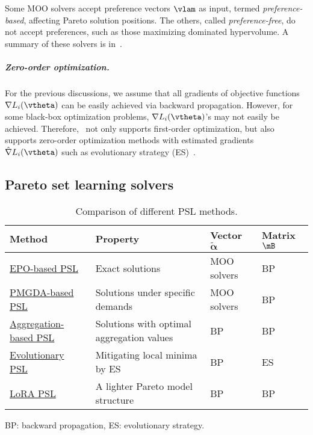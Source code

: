 Some MOO solvers accept preference vectors $\vlam$ as input, termed \emph{preference-based}, affecting Pareto solution positions. The others, called \emph{preference-free}, do not accept preferences, such as those maximizing dominated hypervolume. A summary of these solvers is in~.

\subparagraph{Zero-order optimization.}
For the previous discussions, we assume that all gradients of objective functions $\nabla L_i(\vtheta)$ can be easily achieved via backward propagation. However, for some black-box optimization problems, $\nabla L_i(\vtheta)$'s may not easily be achieved. Therefore, \algoname~not only supports first-order optimization, but also supports zero-order optimization methods with estimated gradients $\hat{\nabla} L_i(\vtheta)$ such as evolutionary strategy (ES)~\cite{beyer2002evolution}.

\subsection{Pareto set learning solvers} \label{sec:psl}

\begin{table}[h!]

\caption{Comparison of different PSL methods.} 
\label{tab:psl_comparison}
\centering
\small
\begin{threeparttable}
    \begin{tabular}{llll}
    \toprule
    \textbf{Method} & \textbf{Property} & Vector $\tilde{\bm \alpha}$ & Matrix $\mB$ \\
    \midrule
    \href{https://openreview.net/pdf/9c01e8c47f7e80e87af0175ac2a5e9a356f518bd.pdf}{EPO-based PSL}~\cite{navon2020learning} & Exact solutions & MOO solvers & BP\\
    
    \href{https://arxiv.org/abs/2402.09492}{PMGDA-based PSL}~\cite{zhang2024pmgda} & Solutions under specific demands & MOO solvers & BP \\\href{https://openreview.net/pdf/9c01e8c47f7e80e87af0175ac2a5e9a356f518bd.pdf}{Aggregation-based PSL}~\cite{navon2020learning} & Solutions with optimal aggregation values & BP & BP\\
    
    \href{https://arxiv.org/pdf/2310.20426}{Evolutionary PSL}~\cite{lin2023evolutionary} & Mitigating local minima by ES & BP & ES \\
    
    \href{https://openreview.net/pdf?id=a2uFstsHPb}{LoRA PSL}~\cite{chen2024efficient,zhong2024panacea,dimitriadis2024pareto} & A lighter Pareto model structure & BP & BP \\
    \bottomrule
    \end{tabular}
    \begin{tablenotes}
        \footnotesize
        \item 
        BP: backward propagation, 
        ES: evolutionary strategy.
    \end{tablenotes}
\end{threeparttable}
\end{table}

